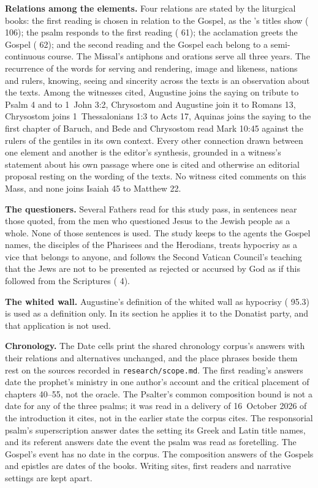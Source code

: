 {\textbf{Relations among the elements.} Four relations are stated by the
liturgical books: the first reading is chosen in relation to the Gospel, as
the 's titles show ( 106); the psalm responds to
the first reading ( 61); the acclamation greets the
Gospel ( 62); and the second reading and the Gospel
each belong to a semi-continuous course. The Missal's antiphons and orations
serve all three years. The recurrence of the words for serving and rendering,
image and likeness, nations and rulers, knowing, seeing and sincerity across
the texts is an observation about the texts. Among the witnesses cited,
Augustine joins the saying on tribute to Psalm 4 and to 1~John 3:2, Chrysostom
and Augustine join it to Romans 13, Chrysostom joins 1~Thessalonians 1:3 to
Acts 17, Aquinas joins the saying to the first chapter of Baruch, and Bede and
Chrysostom read Mark 10:45 against the rulers of the gentiles in its own
context. Every other connection drawn between one element and another is the
editor's synthesis, grounded in a witness's statement about his own passage
where one is cited and otherwise an editorial proposal resting on the wording
of the texts. No witness cited comments on this Mass, and none joins Isaiah 45
to Matthew 22.

\textbf{The questioners.} Several Fathers read for this study pass, in
sentences near those quoted, from the men who questioned Jesus to the Jewish
people as a whole. None of those sentences is used. The study keeps to the
agents the Gospel names, the disciples of the Pharisees and the Herodians,
treats hypocrisy as a vice that belongs to anyone, and follows the Second
Vatican Council's teaching that the Jews are not to be presented as rejected or
accursed by God as if this followed from the Scriptures (
4).

\textbf{The whited wall.} Augustine's definition of the whited wall as
hypocrisy ( 95.3) is used as a definition only.
In its section he applies it to the Donatist party, and that application is not
used.

\textbf{Chronology.} The Date cells print the shared chronology corpus's
answers with their relations and alternatives unchanged, and the place phrases
beside them rest on the sources recorded in \texttt{research/scope.md}. The
first reading's answers date the prophet's ministry in one author's account and
the critical placement of chapters 40--55, not the oracle. The Psalter's common
composition bound is not a date for any of the three psalms; it was read in a
delivery of 16~October 2026 of the introduction it cites, not in the earlier
state the corpus cites. The responsorial psalm's superscription answer dates the
setting its Greek and Latin title names, and its referent answers date the
event the psalm was read as foretelling. The Gospel's event has no date in the
corpus. The composition answers of the Gospels and epistles are dates of the
books. Writing sites, first readers and narrative settings are kept apart.

}
